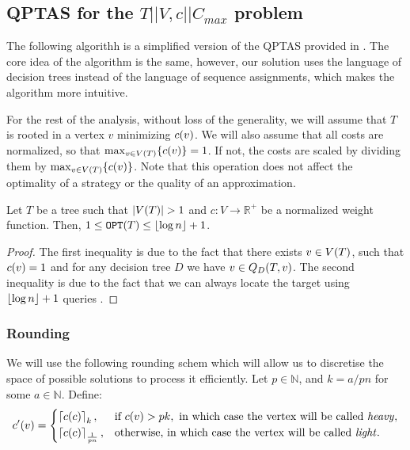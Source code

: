 
\subsection{QPTAS for the $T||V,c||C_{max}$ problem}

The following algorithh is a simplified version of the QPTAS provided in \cite{dereniowski2017ApproxSsForGeneralBSinWTs}. The core idea of the algorithm is the same, however, our solution uses the language of decision trees instead of the language of sequence assignments, which makes the algorithm more intuitive.

For the rest of the analysis, without loss of the generality, we will assume that $T$ is rooted in a vertex $v$ minimizing $c\mathopen{}\left( v \right)$.  We will also assume that all costs are normalized, so that $\max_{v\in V\mathopen{}\left( T \right)}\mathopen{}\left\{ c\mathopen{}\left( v \right) \right\}=1$. If not, the costs are scaled by dividing them by $\max_{v\in V\mathopen{}\left( T \right)}\mathopen{}\left\{ c(v) \right\}$. Note that this operation does not affect the optimality of a strategy or the quality of an approximation.
\begin{observation}\label{basicBoundsOnCost}
    Let $T$ be a tree such that $\spr{V\br{T}}> 1$ and $c:V\to \mathbb{R}^+$ be a normalized weight function. Then, $1\leq \texttt{OPT}(T) \leq \mathopen{}\left\lfloor \log n \right\rfloor+1$.
    \begin{proof}
        The first inequality is due to the fact that there exists $v\in V\mathopen{}\left( T \right)$, such that $c\mathopen{}\left( v \right)=1$ and for any decision tree $D$ we have $v\in Q_{D}\mathopen{}\left( T,v \right)$. The second inequality is due to the fact that we can always locate the target using $\mathopen{}\left\lfloor \log n \right\rfloor+1$ queries \cite{OnakParys2006GenOfBSSInTsAndFLikePosets}.
    \end{proof}
\end{observation}
\subsubsection{Rounding}
We will use the following rounding schem which will allow us to discretise the space of possible solutions to process it efficiently. Let $p \in\mathbb{N}$, and $k=a/pn$ for some $a\in\mathbb{N}$. Define:
$$
c'\mathopen{}\left( v \right)=\begin{cases}
    \mathopen{}\left\lceil c\mathopen{}\left( c \right) \right\rceil_k, & \text{if } c\mathopen{}\left( v \right)>pk, \text{ in which case the vertex will be called \textit{heavy}},\\
    \mathopen{}\left\lceil c\mathopen{}\left( c \right) \right\rceil_{\frac{1}{pn}}, & \text{otherwise, in which case the vertex will be called \textit{light}}.\\
\end{cases}
$$

